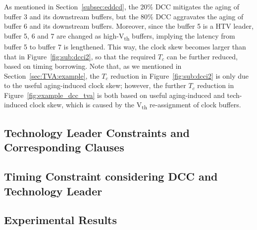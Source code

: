 As mentioned in Section~\ref{subsec:eddcd}, the 20\% DCC mitigates the aging of buffer 3 and its downstream buffers, but the 80\% DCC aggravates the aging of buffer 6 and its downstream buffers. Moreover, since the buffer 5 is a HTV leader, buffer 5, 6 and 7 are changed as high-V\textsubscript{th} buffers, implying the latency from buffer 5 to buffer 7 is lengthened. This way, the clock skew becomes larger than that in Figure~\ref{fig:sub:dcci2}, so that the required $T_c$ can be further reduced, based on timing borrowing. Note that, as we mentioned in Section~\ref{sec:TVA:example}, the $T_c$ reduction in Figure~\ref{fig:sub:dcci2} is only due to the useful aging-induced clock skew; however, the  further $T_c$ reduction in Figure~\ref{fig:example_dcc_tva} is both based on useful aging-induced and tech-induced clock skew, which is caused by the V\textsubscript{th} re-assignment of clock buffers.
\subsection{Technology Leader Constraints and Corresponding Clauses}
\label{sec:TVA:leaderconstraint}

\subsection{Timing Constraint considering DCC and Technology Leader}
\label{sec:TVA:timingconstraint}

\subsection{Experimental Results}
\label{sec:TVA:experiment}